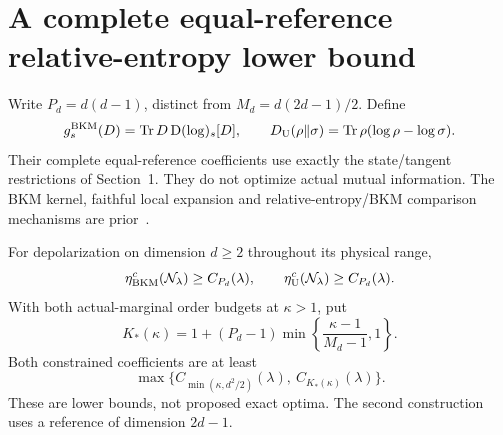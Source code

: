 \section{A complete equal-reference relative-entropy lower bound}\label{sec:bkm}
Write \(P_d=d(d-1)\), distinct from \(M_d=d(2d-1)/2\). Define
\[
 g^{\mathrm{BKM}}_s(D)=\operatorname{Tr} D\,\mathrm{D}(\log)_s[D],\qquad
 D_{\mathrm U}(\rho\Vert\sigma)=\operatorname{Tr}\rho(\log\rho-\log\sigma).
\]
Their complete equal-reference coefficients use exactly the state/tangent restrictions of Section~1. They do not optimize actual mutual information. The BKM kernel, faithful local expansion and relative-entropy/BKM comparison mechanisms are prior~\cite{HR,Reverse,HanLi}.

\begin{theorem}\label{thm:bkm}
For depolarization on dimension \(d\ge2\) throughout its physical range,
\[
 \eta^c_{\mathrm{BKM}}(\mathcal N_\lambda)\ge C_{P_d}(\lambda),\qquad
 \eta^c_{\mathrm U}(\mathcal N_\lambda)\ge C_{P_d}(\lambda).
\]
With both actual-marginal order budgets at \(\kappa>1\), put
\[
 K_*(\kappa)=1+(P_d-1)\min\left\{\frac{\kappa-1}{M_d-1},1\right\}.
\]
Both constrained coefficients are at least
\[
 \max\{C_{\min(\kappa,d^2/2)}(\lambda),\ C_{K_*(\kappa)}(\lambda)\}.
\]
These are lower bounds, not proposed exact optima. The second construction uses a reference of dimension \(2d-1\).
\end{theorem}
